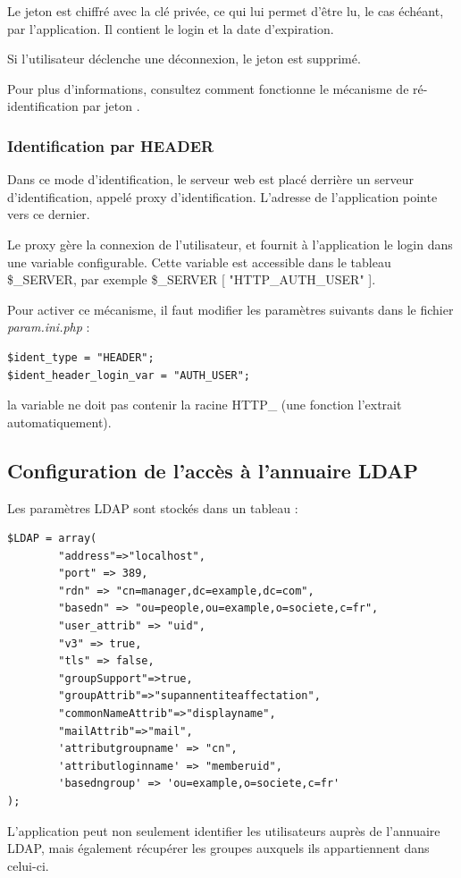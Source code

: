 Le jeton est chiffré avec la clé privée, ce qui lui permet d'être lu, le cas échéant, par l'application. Il contient le login et la date d'expiration. 

Si l'utilisateur déclenche une déconnexion, le jeton est supprimé.

Pour plus d'informations, consultez comment fonctionne le mécanisme de ré-identification par jeton \cite{token}.

\subsubsection{Identification par HEADER}

Dans ce mode d'identification, le serveur web est placé derrière un serveur d'identification, appelé proxy d'identification. L'adresse de l'application pointe vers ce dernier. 

Le proxy gère la connexion de l'utilisateur, et fournit à l'application le login dans une variable configurable. Cette variable est accessible dans le tableau \$\_SERVER, par exemple \$\_SERVER [ "HTTP\_AUTH\_USER" ].

Pour activer ce mécanisme, il faut modifier les paramètres suivants dans le fichier \textit{param.ini.php} :
\begin{lstlisting}
$ident_type = "HEADER";
$ident_header_login_var = "AUTH_USER";
\end{lstlisting}

la variable ne doit pas contenir la racine HTTP\_ (une fonction l'extrait automatiquement).

\subsection{Configuration de l'accès à l'annuaire LDAP}

Les paramètres LDAP sont stockés dans un tableau :
\begin{lstlisting}
$LDAP = array(
		"address"=>"localhost",
		"port" => 389,
		"rdn" => "cn=manager,dc=example,dc=com",
		"basedn" => "ou=people,ou=example,o=societe,c=fr",
		"user_attrib" => "uid",
		"v3" => true,
		"tls" => false,
		"groupSupport"=>true,
		"groupAttrib"=>"supannentiteaffectation",
		"commonNameAttrib"=>"displayname",
		"mailAttrib"=>"mail",
		'attributgroupname' => "cn",
		'attributloginname' => "memberuid",
		'basedngroup' => 'ou=example,o=societe,c=fr'
);
\end{lstlisting}


L'application peut non seulement identifier les utilisateurs auprès de l'annuaire LDAP, mais également récupérer les groupes auxquels ils appartiennent dans celui-ci.

